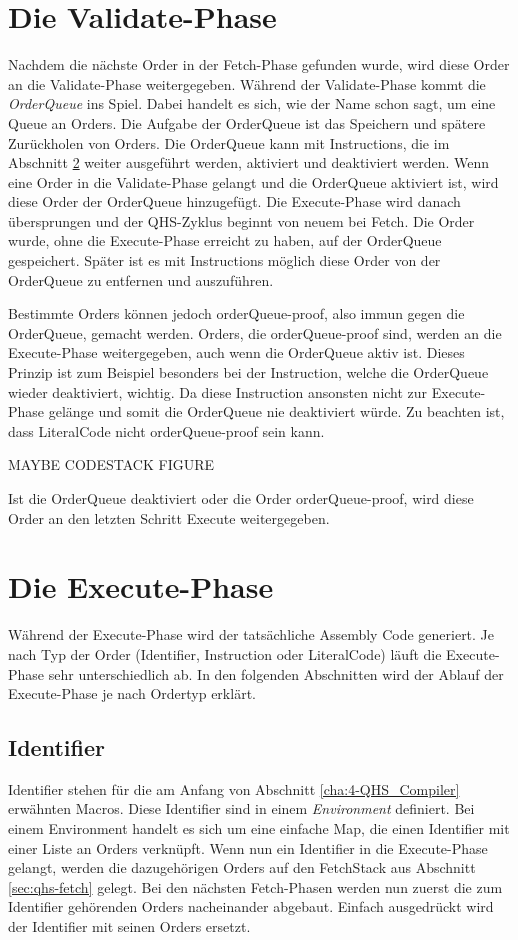 \section{Die Validate-Phase} \label{sec:qhs-Validate}
Nachdem die nächste Order in der  Fetch-Phase gefunden wurde, wird diese Order an die Validate-Phase weitergegeben. Während der Validate-Phase kommt die \textit{OrderQueue} ins Spiel.
Dabei handelt es sich, wie der Name schon sagt, um eine Queue an Orders.
Die Aufgabe der OrderQueue ist das Speichern und spätere Zurückholen von Orders. Die OrderQueue kann mit Instructions, die im Abschnitt \ref{sec:qhs-execute} weiter ausgeführt werden, aktiviert und deaktiviert werden.
Wenn eine Order in die Validate-Phase gelangt und die OrderQueue aktiviert ist, wird diese Order der OrderQueue hinzugefügt. Die Execute-Phase wird danach übersprungen und der QHS-Zyklus beginnt von neuem bei Fetch.
Die Order wurde, ohne die Execute-Phase erreicht zu haben, auf der OrderQueue gespeichert. Später ist es mit Instructions möglich diese Order von der OrderQueue zu entfernen und auszuführen.

Bestimmte Orders können jedoch orderQueue-proof, also immun gegen die OrderQueue, gemacht werden. Orders, die orderQueue-proof sind, werden an die Execute-Phase weitergegeben, auch wenn die OrderQueue aktiv ist.
Dieses Prinzip ist zum Beispiel besonders bei der Instruction, welche die OrderQueue wieder deaktiviert, wichtig. Da diese Instruction ansonsten nicht zur Execute-Phase gelänge und somit die OrderQueue nie deaktiviert würde.
Zu beachten ist, dass LiteralCode nicht orderQueue-proof sein kann.

MAYBE CODESTACK FIGURE

Ist die OrderQueue deaktiviert oder die Order orderQueue-proof, wird diese Order an den letzten Schritt Execute weitergegeben.

\section{Die Execute-Phase} \label{sec:qhs-execute}
Während der Execute-Phase wird der tatsächliche Assembly Code generiert. Je nach Typ der Order (Identifier, Instruction oder LiteralCode) läuft die Execute-Phase sehr unterschiedlich ab.
In den folgenden Abschnitten wird der Ablauf der Execute-Phase je nach Ordertyp erklärt.

\subsection{Identifier}
Identifier stehen für die am Anfang von Abschnitt \ref{cha:4-QHS_Compiler} erwähnten Macros. Diese Identifier sind in einem \textit{Environment} definiert.
Bei einem Environment handelt es sich um eine einfache Map, die einen Identifier mit einer Liste an Orders verknüpft.
Wenn nun ein Identifier in die Execute-Phase gelangt, werden die dazugehörigen Orders auf den FetchStack aus Abschnitt \ref{sec:qhs-fetch} gelegt.
Bei den nächsten Fetch-Phasen werden nun zuerst die zum Identifier gehörenden Orders nacheinander abgebaut. Einfach ausgedrückt wird der Identifier mit seinen Orders ersetzt.

